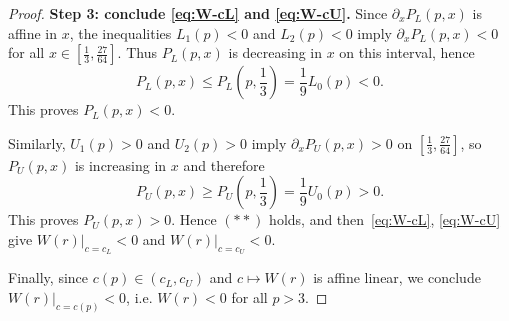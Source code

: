 \documentclass[11pt]{article}
\theoremstyle{definition}
\newtheorem{remark}[theorem]{Remark}
\newcommand{\1}{\mathbf{1}}
\begin{document}
\begin{proof}
\smallskip
\noindent\textbf{Step 3: conclude \eqref{eq:W-cL} and \eqref{eq:W-cU}.}
Since $\partial_x P_L(p,x)$ is affine in $x$, the inequalities $L_1(p)<0$ and $L_2(p)<0$
imply $\partial_x P_L(p,x)<0$ for all $x\in[\frac13,\frac{27}{64}]$. Thus $P_L(p,x)$ is decreasing in $x$ on this interval, hence
\[
P_L(p,x)\le P_L\!\left(p,\frac13\right)=\frac{1}{9}L_0(p)<0.
\]
This proves $P_L(p,x)<0$.

Similarly, $U_1(p)>0$ and $U_2(p)>0$ imply $\partial_x P_U(p,x)>0$ on
$[\frac13,\frac{27}{64}]$, so $P_U(p,x)$ is increasing in $x$ and therefore
\[
P_U(p,x)\ge P_U\!\left(p,\frac13\right)=\frac{1}{9}U_0(p)>0.
\]
This proves $P_U(p,x)>0$. Hence $(\ast\ast)$ holds, and then~\eqref{eq:W-cL}, \eqref{eq:W-cU}
give $W(r)\big|_{c=c_L}<0$ and $W(r)\big|_{c=c_U}<0$.

\smallskip
Finally, since $c(p)\in(c_L,c_U)$ and $c\mapsto W(r)$ is affine linear, we conclude
$W(r)\big|_{c=c(p)}<0$, i.e. $W(r)<0$ for all $p>3$.
\end{proof}





\end{document}
